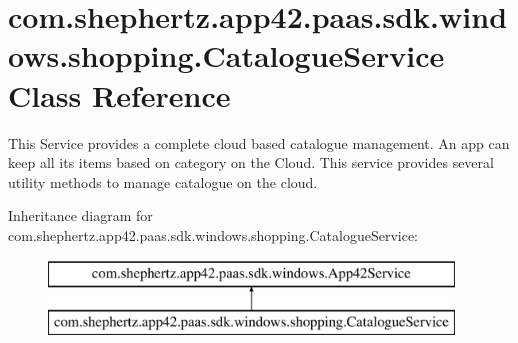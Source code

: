 \hypertarget{classcom_1_1shephertz_1_1app42_1_1paas_1_1sdk_1_1windows_1_1shopping_1_1_catalogue_service}{\section{com.\+shephertz.\+app42.\+paas.\+sdk.\+windows.\+shopping.\+Catalogue\+Service Class Reference}
\label{classcom_1_1shephertz_1_1app42_1_1paas_1_1sdk_1_1windows_1_1shopping_1_1_catalogue_service}
}


This Service provides a complete cloud based catalogue management. An app can keep all its items based on category on the Cloud. This service provides several utility methods to manage catalogue on the cloud.  


Inheritance diagram for com.\+shephertz.\+app42.\+paas.\+sdk.\+windows.\+shopping.\+Catalogue\+Service\+:\begin{figure}[H]
\begin{center}
\leavevmode
\includegraphics[height=2.000000cm]{classcom_1_1shephertz_1_1app42_1_1paas_1_1sdk_1_1windows_1_1shopping_1_1_catalogue_service}
\end{center}
\end{figure}
